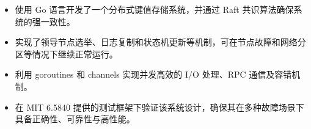 


\begin{itemize}[nosep]
  \item 使用 Go 语言开发了一个分布式键值存储系统，并通过 Raft 共识算法确保系统的强一致性。
  \item 实现了领导节点选举、日志复制和状态机更新等机制，可在节点故障和网络分区等情况下继续正常运行。
  \item 利用 goroutines 和 channels 实现并发高效的 I/O 处理、RPC 通信及容错机制。
  \item 在 MIT 6.5840 提供的测试框架下验证该系统设计，确保其在多种故障场景下具备正确性、可靠性与高性能。
\end{itemize}
